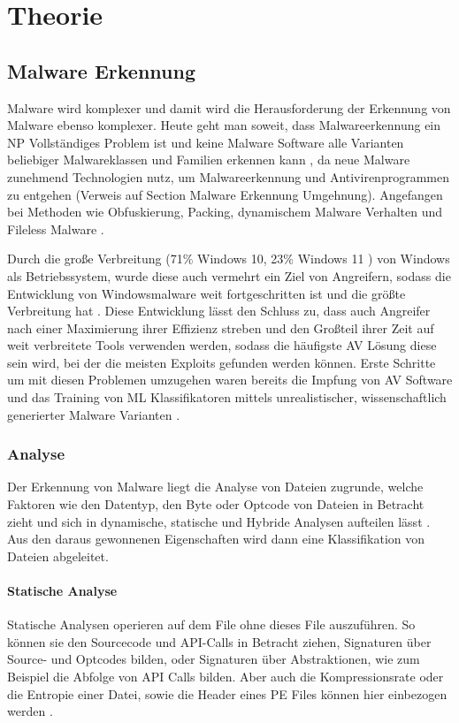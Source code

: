 \chapter{Theorie}
\label{chapter:theorie}

\section{Malware Erkennung}
Malware wird komplexer \cite{pascalmaniriho_2023_a}  und damit wird die Herausforderung der Erkennung von Malware ebenso komplexer. Heute geht man soweit, dass Malwareerkennung ein NP Vollständiges Problem ist \cite{pascalmaniriho_2023_a} und keine Malware Software alle Varianten beliebiger Malwareklassen und Familien erkennen kann \cite{aboaoja_2022_malware}, da neue Malware zunehmend Technologien nutz, um Malwareerkennung und Antivirenprogrammen zu entgehen (Verweis auf Section Malware Erkennung Umgehnung). Angefangen bei Methoden wie Obfuskierung, Packing, dynamischem Malware Verhalten und Fileless Malware \cite{aslan_2020_a}. 

Durch die große Verbreitung (71\% Windows 10, 23\% Windows 11 \cite{Klotz, A}) von Windows als Betriebssystem, wurde diese auch vermehrt ein Ziel von Angreifern, sodass die Entwicklung von Windowsmalware weit fortgeschritten ist und die größte Verbreitung hat \cite{aslan_2020_a}. Diese Entwicklung lässt den Schluss zu, dass auch Angreifer nach einer Maximierung ihrer Effizienz streben und den Großteil ihrer Zeit auf weit verbreitete Tools verwenden werden, sodass die häufigste AV Lösung diese sein wird, bei der die meisten Exploits gefunden werden können. Erste Schritte um mit diesen Problemen umzugehen waren bereits die Impfung von AV Software \cite{murali_2023_evolving} und das Training von ML Klassifikatoren mittels unrealistischer, wissenschaftlich generierter Malware Varianten \cite{dyrmishi_2023_on}.

\subsection{Analyse}
Der Erkennung von Malware liegt die Analyse von Dateien zugrunde, welche Faktoren wie den Datentyp, den Byte oder Optcode von Dateien in Betracht zieht und sich in dynamische, statische und Hybride Analysen aufteilen lässt \cite{aboaoja_2023_a}. Aus den daraus gewonnenen Eigenschaften wird dann eine Klassifikation von Dateien abgeleitet.
\subsubsection{Statische Analyse}
Statische Analysen operieren auf dem File ohne dieses File auszuführen. So können sie den Sourcecode und API-Calls in Betracht ziehen, Signaturen über Source- und Optcodes bilden, oder Signaturen über Abstraktionen, wie zum Beispiel die Abfolge von API Calls\cite{pascalmaniriho_2023_apimaldetect} bilden. Aber auch die Kompressionsrate oder die Entropie einer Datei, sowie die Header eines PE Files können hier einbezogen werden \cite{aboaoja_2023_a, aslan_2020_a}. 

